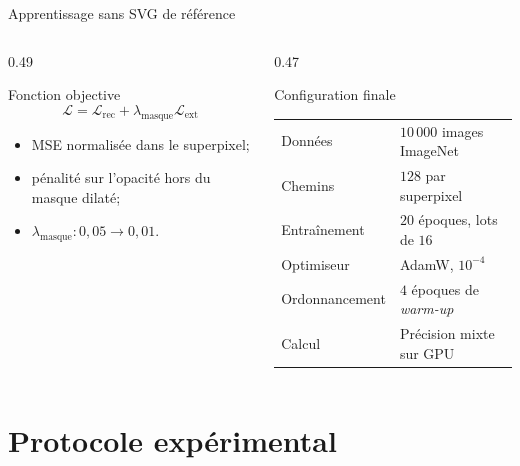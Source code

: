 \documentclass[11pt,aspectratio=169]{beamer}
\begin{document}
\begin{frame}{Apprentissage sans SVG de référence}
  \vspace{0.25cm}
  \begin{columns}[T,onlytextwidth]
    \begin{column}{0.49\textwidth}
      \begin{block}{Fonction objective}
        \[
          \mathcal L=\mathcal L_{\mathrm{rec}}
          +\lambda_{\mathrm{masque}}\mathcal L_{\mathrm{ext}}
        \]
        \begin{itemize}\small
          \item MSE normalisée dans le superpixel;
          \item pénalité sur l'opacité hors du masque dilaté;
          \item $\lambda_{\mathrm{masque}}: 0{,}05\rightarrow0{,}01$.
        \end{itemize}
      \end{block}
    \end{column}
    \begin{column}{0.47\textwidth}
      \begin{block}{Configuration finale}
        \scriptsize
        \begin{tabular}{@{}ll@{}}
          Données & $10\,000$ images ImageNet \\
          Chemins & $128$ par superpixel \\
          Entraînement & $20$ époques, lots de $16$ \\
          Optimiseur & AdamW, $10^{-4}$ \\
          Ordonnancement & $4$ époques de \textit{warm-up} \\
          Calcul & Précision mixte sur GPU \\
        \end{tabular}
      \end{block}
    \end{column}
  \end{columns}
\end{frame}

\section{Protocole expérimental}
\end{document}

